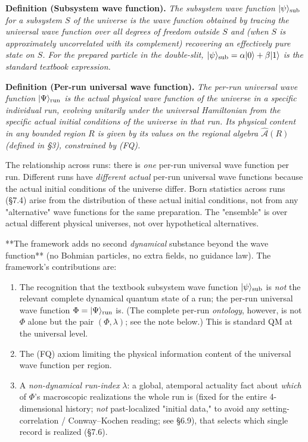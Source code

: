 \documentclass[11pt,a4paper]{article}
\begin{document}
\textbf{Definition (Subsystem wave function).} \emph{The subsystem wave function $|\psi\rangle_{\rm sub}$ for a subsystem $S$ of the universe is the wave function obtained by tracing the universal wave function over all degrees of freedom outside $S$ and (when $S$ is approximately uncorrelated with its complement) recovering an effectively pure state on $S$. For the prepared particle in the double-slit, $|\psi\rangle_{\rm sub} = \alpha|0\rangle + \beta|1\rangle$ is the standard textbook expression.}

\textbf{Definition (Per-run universal wave function).} \emph{The per-run universal wave function $|\Psi\rangle_{\rm run}$ is the actual physical wave function of the universe in a specific individual run, evolving unitarily under the universal Hamiltonian from the specific actual initial conditions of the universe in that run. Its physical content in any bounded region $R$ is given by its values on the regional algebra $\hat{\mathcal{A}}(R)$ (defined in §3), constrained by (FQ).}

The relationship across runs: there is \emph{one} per-run universal wave function per run. Different runs have \emph{different actual} per-run universal wave functions because the actual initial conditions of the universe differ. Born statistics across runs (§7.4) arise from the distribution of these actual initial conditions, not from any "alternative" wave functions for the same preparation. The "ensemble" is over actual different physical universes, not over hypothetical alternatives.

**The framework adds no second \emph{dynamical} substance beyond the wave function** (no Bohmian particles, no extra fields, no guidance law). The framework's contributions are:
\begin{enumerate}
  \item The recognition that the textbook subsystem wave function $|\psi\rangle_{\rm sub}$ is \emph{not} the relevant complete dynamical quantum state of a run; the per-run universal wave function $\Phi = |\Psi\rangle_{\rm run}$ is. (The complete per-run \emph{ontology}, however, is not $\Phi$ alone but the pair $(\Phi, \lambda)$; see the note below.) This is standard QM at the universal level.
  \item The (FQ) axiom limiting the physical information content of the universal wave function per region.
  \item A \emph{non-dynamical run-index} $\lambda$: a global, atemporal actuality fact about \emph{which} of $\Phi$'s macroscopic realizations the whole run is (fixed for the entire 4-dimensional history; \emph{not} past-localized "initial data," to avoid any setting-correlation / Conway–Kochen reading; see §6.9), that selects which single record is realized (§7.6).
\end{enumerate}
\end{document}
